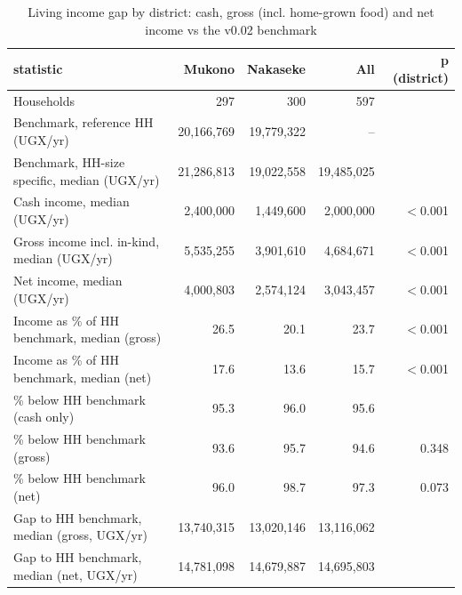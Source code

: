 \begin{table}[htbp]
\centering
\caption{Living income gap by district: cash, gross (incl. home-grown food) and net income vs the v0.02 benchmark}
\label{tab:living_income_gap_summary}
\begin{tabular}{lrrrr}
\toprule
statistic & Mukono & Nakaseke & All & p (district) \\
\midrule
Households & 297 & 300 & 597 &  \\
Benchmark, reference HH (UGX/yr) & 20,166,769 & 19,779,322 & -- &  \\
Benchmark, HH-size specific, median (UGX/yr) & 21,286,813 & 19,022,558 & 19,485,025 &  \\
Cash income, median (UGX/yr) & 2,400,000 & 1,449,600 & 2,000,000 & $<$0.001 \\
Gross income incl. in-kind, median (UGX/yr) & 5,535,255 & 3,901,610 & 4,684,671 & $<$0.001 \\
Net income, median (UGX/yr) & 4,000,803 & 2,574,124 & 3,043,457 & $<$0.001 \\
Income as \% of HH benchmark, median (gross) & 26.5 & 20.1 & 23.7 & $<$0.001 \\
Income as \% of HH benchmark, median (net) & 17.6 & 13.6 & 15.7 & $<$0.001 \\
\% below HH benchmark (cash only) & 95.3 & 96.0 & 95.6 &  \\
\% below HH benchmark (gross) & 93.6 & 95.7 & 94.6 & 0.348 \\
\% below HH benchmark (net) & 96.0 & 98.7 & 97.3 & 0.073 \\
Gap to HH benchmark, median (gross, UGX/yr) & 13,740,315 & 13,020,146 & 13,116,062 &  \\
Gap to HH benchmark, median (net, UGX/yr) & 14,781,098 & 14,679,887 & 14,695,803 &  \\
\bottomrule
\end{tabular}
\end{table}
